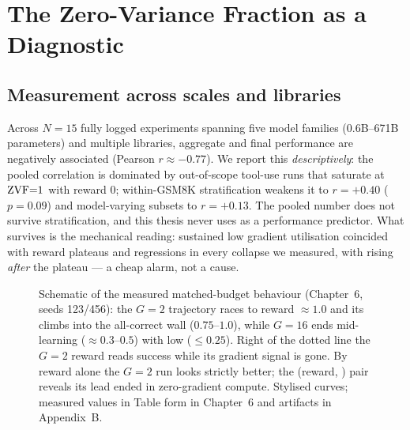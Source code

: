 \chapter{The Zero-Variance Fraction as a Diagnostic}
\label{ch:zvf}

\section{Measurement across scales and libraries}
Across $N{=}15$ fully logged experiments spanning five model families
(0.6B--671B parameters) and multiple libraries, aggregate \ZVF{} and final
performance are negatively associated (Pearson $r\approx-0.77$). We report
this \emph{descriptively}: the pooled correlation is dominated by
out-of-scope tool-use runs that saturate at $\mathrm{ZVF}{=}1$ with reward $0$;
within-GSM8K stratification weakens it to $r{=}+0.40$ ($p{=}0.09$) and
model-varying subsets to $r{=}+0.13$. The pooled number does not survive
stratification, and this thesis never uses \ZVF{} as a performance predictor.
What survives is the mechanical reading: sustained low gradient utilisation
coincided with reward plateaus and regressions in every collapse we measured,
with \ZVF{} rising \emph{after} the plateau --- a cheap alarm, not a cause.

\begin{figure}[t]
\centering
{}
\caption{Schematic of the measured matched-budget behaviour (Chapter~6,
seeds 123/456): the $G{=}2$ trajectory races to reward $\approx1.0$ and its
\ZVF{} climbs into the all-correct wall ($0.75$--$1.0$), while $G{=}16$
ends mid-learning ($\approx0.3$--$0.5$) with \ZVF{} low ($\le0.25$).
Right of the dotted line the $G{=}2$ reward reads success while its
gradient signal is gone. By reward alone the $G{=}2$
run looks strictly better; the (reward, \ZVF{}) pair reveals its lead
ended in zero-gradient compute.
Stylised curves; measured values in Table form in Chapter~6 and artifacts in
Appendix~B.}
\label{fig:disagreement}
\end{figure}

